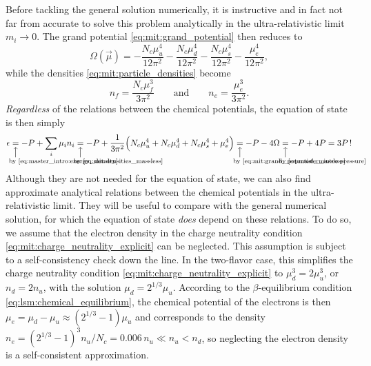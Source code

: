 Before tackling the general solution numerically,
it is instructive and in fact not far from accurate to solve this problem analytically in the ultra-relativistic limit $m_i \rightarrow 0$.
The grand potential \eqref{eq:mit:grand_potential} then reduces to
\begin{equation}
	\Omega(\vec{\mu}) = -\frac{N_c \mu_u^4}{12 \pi^2} - \frac{N_c \mu_d^4}{12 \pi^2} - \frac{N_c \mu_s^4}{12 \pi^2} - \frac{\mu_e^4}{12 \pi^2},
\label{eq:mit:grand_potential_massless}
\end{equation}
while the densities \eqref{eq:mit:particle_densities} become
\begin{equation}
	n_f = \frac{N_c \mu_f^3}{3 \pi^2}
	\qquad \text{and} \qquad
	n_e = \frac{    \mu_e^3}{3 \pi^2}.
\label{eq:mit:densities_massless}
\end{equation}
\emph{Regardless} of the relations between the chemical potentials,
the equation of state is then simply
\begin{equation}
	\epsilon \equalexplbelow{\text{by \eqref{eq:master_intro:energy_density}}} -P + \sum_i \mu_i n_i
	         \equalexplbelow{\text{by \eqref{eq:mit:densities_massless}}} -P + \frac{1}{3 \pi^2} \Big(N_c \mu_u^4 + N_c \mu_d^4 + N_c \mu_s^4 + \mu_e^4\Big)
	         \equalexplbelow{\text{by \eqref{eq:mit:grand_potential_massless}}} -P - 4 \Omega 
	         \equalexplbelow{\text{by \eqref{eq:master_intro:pressure}}} -P + 4 P 
	         = 3 P \, !
\label{eq:mit:eos_ur}
\end{equation}
Although they are not needed for the equation of state,
we can also find approximate analytical relations between the chemical potentials in the ultra-relativistic limit.
They will be useful to compare with the general numerical solution, for which the equation of state \emph{does} depend on these relations.
To do so, we assume that the electron density in the charge neutrality condition \eqref{eq:mit:charge_neutrality_explicit} can be neglected.
This assumption is subject to a self-consistency check down the line.
In the two-flavor case, this simplifies the charge neutrality condition \eqref{eq:mit:charge_neutrality_explicit} to $\mu_d^3 = 2 \mu_u^3$, or $n_d = 2 n_u$, with the solution $\mu_d = 2^{1/3} \mu_u$.
According to the $\beta$-equilibrium condition \eqref{eq:lsm:chemical_equilibrium},
the chemical potential of the electrons is then $\mu_e = \mu_d - \mu_u \approx (2^{1/3}-1) \mu_u$
and corresponds to the density $n_e = (2^{1/3}-1)^3 n_u / N_c = 0.006 \, n_u \ll n_u < n_d$,
so neglecting the electron density is a self-consistent approximation.

